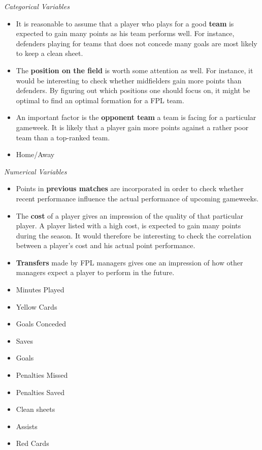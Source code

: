 \textit{Categorical Variables}
\newpar
\begin{itemize}
    \item It is reasonable to assume that a player who plays for a good \textbf{team} is expected to gain many points as his team performs well. For instance, defenders playing for teams that does not concede many goals are most likely to keep a clean sheet.
    
    \item The \textbf{position on the field} is worth some attention as well. For instance, it would be interesting to check whether midfielders gain more points than defenders. By figuring out which positions one should focus on, it might be optimal to find an optimal formation for a FPL team.
    \item An important factor is the \textbf{opponent team} a team is facing for a particular gameweek. It is likely that a player gain more points against a rather poor team than a top-ranked team.
    \item Home/Away
\end{itemize}
\newpar

\textit{Numerical Variables}
\newpar
\begin{itemize}
    \item Points in \textbf{previous matches} are incorporated in order to check whether recent performance influence the actual performance of upcoming gameweeks. \item The \textbf{cost} of a player gives an impression of the quality of that particular player. A player listed with a high cost, is expected to gain many points during the season. It would therefore be interesting to check the correlation between a player's cost and his actual point performance.
    \item \textbf{Transfers} made by FPL managers gives one an impression of how other managers expect a player to perform in the future.
    \item Minutes Played
    \item Yellow Cards
    \item Goals Conceded
    \item Saves
    \item Goals
    \item Penalties Missed
    \item Penalties Saved
    \item Clean sheets
    \item Assists
    \item Red Cards
\end{itemize}

